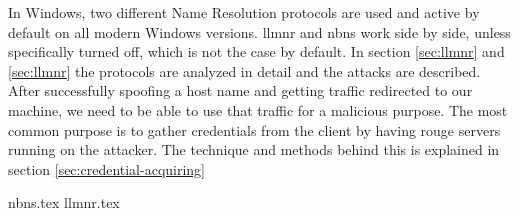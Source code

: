 \documentclass{article}
\begin{document}
In Windows, two different Name Resolution protocols are used and active by default on all modern Windows versions. \gls{llmnr} and \gls{nbns} work side by side, unless specifically turned off, which is not the case by default. In section \ref{sec:llmnr} and \ref{sec:llmnr} the protocols are analyzed in detail and the attacks are described.
\\
After successfully spoofing a host name and getting traffic redirected to our machine, we need to be able to use that traffic for a malicious purpose. The most common purpose is to gather credentials from the client by having rouge servers running on the attacker. The technique and methods behind this is explained in section \ref{sec:credential-acquiring}

{nbns.tex}
{llmnr.tex}
\end{document}
